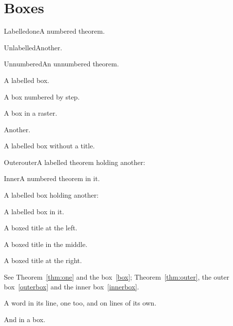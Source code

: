 \documentclass{article}
\newcounter{exercise}
\begin{document}
\tableofcontents
\section{Boxes}
\begin{theorem}{Labelled}{one}A numbered theorem.\end{theorem}
\begin{theorem}{Unlabelled}{}Another.\end{theorem}
\begin{theorem*}{Unnumbered}{}An unnumbered theorem.\end{theorem*}
\begin{tcolorbox}[title=Labelled box, label=box]A labelled box.\end{tcolorbox}
\begin{tcolorbox}[step=exercise, title=Exercise]A box numbered by step.\end{tcolorbox}
\begin{tcbraster}[raster columns=2]
\begin{tcolorbox}[title=In a raster]A box in a raster.\end{tcolorbox}
\begin{tcolorbox}[title=Also in a raster]Another.\end{tcolorbox}
\end{tcbraster}
\begin{tcolorbox}[label=untitled]A labelled box without a title.\end{tcolorbox}
\begin{theorem}{Outer}{outer}A labelled theorem holding another:
\begin{theorem}{Inner}{}A numbered theorem in it.\end{theorem}
\end{theorem}
\begin{tcolorbox}[title=Outer box, label=outerbox]A labelled box holding another:
\begin{tcolorbox}[title=Inner box, label=innerbox]A labelled box in it.\end{tcolorbox}
\end{tcolorbox}
\begin{tcolorbox}[boxed=left, title=Boxed left]A boxed title at the left.\end{tcolorbox}
\begin{tcolorbox}[boxed=center, title=Boxed center]A boxed title in the middle.\end{tcolorbox}
\begin{tcolorbox}[boxed=right, title=Boxed right]A boxed title at the right.\end{tcolorbox}
See Theorem~\ref{thm:one} and the box~\ref{box}; Theorem~\ref{thm:outer}, the
outer box~\ref{outerbox} and the inner box~\ref{innerbox}.

A word  in its line, 
one too, and  on lines of its own.
\begin{tcolorbox}And  in a box.\end{tcolorbox}
\end{document}
